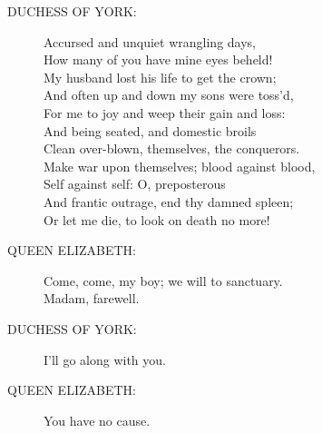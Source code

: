 \documentclass{article}
\begin{document}
\begin{description}
\item[DUCHESS OF YORK:] 
\hspace{1pt}Accursed and unquiet wrangling days,\\
\hspace{1pt}How many of you have mine eyes beheld!\\
\hspace{1pt}My husband lost his life to get the crown;\\
\hspace{1pt}And often up and down my sons were toss'd,\\
\hspace{1pt}For me to joy and weep their gain and loss:\\
\hspace{1pt}And being seated, and domestic broils\\
\hspace{1pt}Clean over-blown, themselves, the conquerors.\\
\hspace{1pt}Make war upon themselves; blood against blood,\\
\hspace{1pt}Self against self: O, preposterous\\
\hspace{1pt}And frantic outrage, end thy damned spleen;\\
\hspace{1pt}Or let me die, to look on death no more!\\
\end{description}
\begin{description}
\item[QUEEN ELIZABETH:] 
\hspace{1pt}Come, come, my boy; we will to sanctuary.\\
\hspace{1pt}Madam, farewell.\\
\end{description}
\begin{description}
\item[DUCHESS OF YORK:] 
\hspace{1pt}I'll go along with you.\\
\end{description}
\begin{description}
\item[QUEEN ELIZABETH:] 
\hspace{1pt}You have no cause.\\
\end{description}
\end{document}

